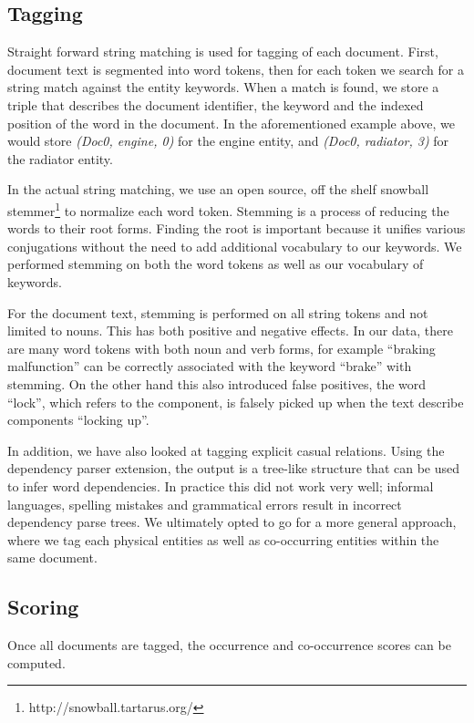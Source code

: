 \subsection{Tagging}
Straight forward string matching is used for tagging of each document.
First, document text is segmented into word tokens, then for each token we
search for a string match against the entity keywords. When a match is found, we
store a triple that describes the document identifier, the keyword and the
indexed position of the word in the document. In the aforementioned example
above, we would store
\emph{(Doc0, engine, 0)} for the engine entity, and \emph{(Doc0, radiator, 3)}
for the radiator entity.

In the actual string matching, we use an open source, off the shelf snowball
stemmer\footnote{http://snowball.tartarus.org/} to normalize each word token. 
Stemming is a process of reducing the words to their root forms. Finding the
root is important because it unifies various conjugations without the need to
add additional vocabulary to our keywords. We performed stemming on both the
word tokens as well as our vocabulary of keywords.

For the document text, stemming is performed on all string tokens and not
limited to nouns. This has both positive and negative effects. In our data, 
there are many word tokens with both noun and verb forms, for example ``braking
malfunction'' can be correctly associated with the keyword ``brake'' with
stemming. On the other hand this also introduced false positives, the word
``lock'', which refers to the component, is falsely picked up when the text describe components
``locking up''.

In addition, we have also looked at tagging explicit casual relations. Using the
dependency parser extension, the output is a tree-like structure that can be used to infer
word dependencies. In practice this did not work very well; informal languages,
spelling mistakes and grammatical errors result in incorrect dependency parse
trees. We ultimately opted to go for a more general approach, where we tag each
physical entities as well as co-occurring entities within the same document.


\subsection{Scoring}
Once all documents are tagged, the occurrence and co-occurrence scores can be
computed. 

